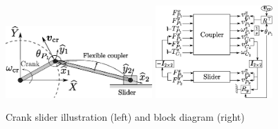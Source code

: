 \documentclass{svjour3}                     %
\begin{document}
\begin{figure}[tb]
	\centering
	\includegraphics[width=0.5\textwidth]{cr_slider.eps} 
	\includegraphics[width=0.4\textwidth]{block_crslider.eps} 
	\caption{Crank slider illustration (left) and block diagram (right)}
	\label{fig:crsl}
\end{figure}
\end{document}
